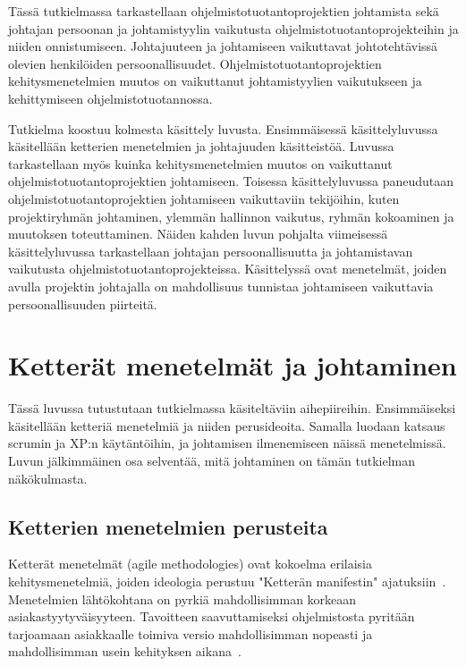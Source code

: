 \documentclass[finnish]{tktltiki2}
\theoremstyle{definition}
\theoremstyle{remark}
\begin{document}
Tässä tutkielmassa tarkastellaan ohjelmistotuotantoprojektien johtamista sekä johtajan persoonan ja johtamistyylin vaikutusta ohjelmistotuotantoprojekteihin ja niiden onnistumiseen. Johtajuuteen ja johtamiseen vaikuttavat johtotehtävissä olevien henkilöiden persoonallisuudet. Ohjelmistotuotantoprojektien kehitysmenetelmien muutos on vaikuttanut johtamistyylien vaikutukseen ja kehittymiseen ohjelmistotuotannossa. 

Tutkielma koostuu kolmesta käsittely luvusta. Ensimmäisessä käsittelyluvussa käsitellään ketterien menetelmien ja johtajuuden käsitteistöä. Luvussa tarkastellaan myös kuinka kehitysmenetelmien muutos on vaikuttanut ohjelmistotuotantoprojektien johtamiseen. Toisessa käsittelyluvussa paneudutaan ohjelmistotuotantoprojektien johtamiseen vaikuttaviin tekijöihin, kuten projektiryhmän johtaminen, ylemmän hallinnon vaikutus, ryhmän kokoaminen ja muutoksen toteuttaminen. Näiden kahden luvun pohjalta viimeisessä  käsittelyluvussa tarkastellaan johtajan persoonallisuutta ja johtamistavan vaikutusta ohjelmistotuotantoprojekteissa. Käsittelyssä ovat menetelmät, joiden avulla projektin johtajalla on mahdollisuus tunnistaa johtamiseen vaikuttavia persoonallisuuden piirteitä.


\section{Ketterät menetelmät ja johtaminen}

Tässä luvussa tutustutaan tutkielmassa käsiteltäviin aihepiireihin. En\-sim\-mäi\-sek\-si käsitellään ketteriä menetelmiä ja niiden perusideoita. Samalla luodaan katsaus scrumin ja XP:n käytäntöihin, ja johtamisen ilmenemiseen näissä menetelmissä.  Luvun jälkimmäinen osa selventää, mitä johtaminen on tämän tutkielman näkökulmasta.  


\subsection{Ketterien menetelmien perusteita}

Ketterät menetelmät (agile methodologies) ovat kokoelma erilaisia kehitysmenetelmiä, joiden ideologia perustuu "Ketterän manifestin" ajatuksiin~\cite{fowler2001agile}. Menetelmien lähtökohtana on pyrkiä mahdollisimman korkeaan asiakastyytyväisyyteen. Tavoitteen saavuttamiseksi ohjelmistosta pyritään tarjoamaan asiakkaalle toimiva versio mahdollisimman nopeasti ja mahdollisimman usein kehityksen aikana~\cite{fowler2001agile}.
\end{document}
